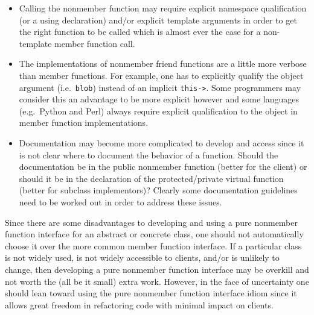 \documentclass[pdf,ps2pdf,11pt]{SANDreport}
\begin{document}
\begin{itemize}

{}\item Calling the nonmember function may require explicit namespace
qualification (or a using declaration) and/or explicit template arguments in
order to get the right function to be called which is almost ever the case for
a non-template member function call.

{}\item The implementations of nonmember friend functions are a little more
verbose than member functions.  For example, one has to explicitly qualify the
object argument (i.e.\ {}\texttt{blob}) instead of an implicit
{}\texttt{this->}.  Some programmers may consider this an advantage to be more
explicit however and some languages (e.g.\ Python and Perl) always require
explicit qualification to the object in member function implementations.

{}\item Documentation may become more complicated to develop and access since
it is not clear where to document the behavior of a function.  Should the
documentation be in the public nonmember function (better for the client) or
should it be in the declaration of the protected/private virtual function
(better for subclass implementors)?  Clearly some documentation guidelines
need to be worked out in order to address these issues.

\end{itemize}

Since there are some disadvantages to developing and using a pure nonmember
function interface for an abstract or concrete class, one should not
automatically choose it over the more common member function interface.  If a
particular class is not widely used, is not widely accessible to clients,
and/or is unlikely to change, then developing a pure nonmember function
interface may be overkill and not worth the (all be it small) extra work.
However, in the face of uncertainty one should lean toward using the pure
nonmember function interface idiom since it allows great freedom in
refactoring code with minimal impact on clients.


%
\clearpage



%
\appendix
%
\end{document}
